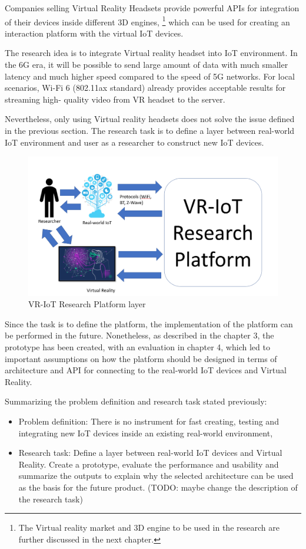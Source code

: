Companies selling Virtual Reality Headsets provide powerful APIs for integration of their devices inside different 3D engines, \footnote{The Virtual reality  market and 3D engine to be used in the research are further discussed in the next chapter.} which can be used for creating an interaction platform with the virtual IoT devices.

The research idea is to integrate Virtual reality headset into IoT environment. In the 6G era, it will be possible to send large amount of data with much smaller latency and much higher speed compared to the speed of 5G networks. For local scenarios, Wi-Fi 6 (802.11ax standard) already provides acceptable results for streaming high- quality video from VR headset to the server.

Nevertheless, only using Virtual reality headsets does not solve the issue defined in the previous section. The research task is to define a layer between real-world IoT environment and user as a researcher to construct new IoT devices. 

\begin{figure}
  \centering
  \includegraphics[width=0.9\linewidth]{figures/VR-IoTResearchPlatformLayer.png}
  \caption{VR-IoT Research Platform layer}
  \label{fig:VR-IoTResearchPlatformLayer-figure}
\end{figure}

Since the task is to define the platform, the implementation of the platform can be performed in the future. Nonetheless, as described in the chapter 3, the prototype has been created, with an evaluation in chapter 4, which led to important assumptions on how the platform should be designed in terms of architecture and API for connecting to the real-world IoT devices and Virtual Reality.

Summarizing the problem definition and research task stated previously:

\begin{itemize}
    \item Problem definition: There is no instrument for fast creating, testing and integrating new IoT devices inside an existing real-world environment,
    \item Research task: Define a layer between real-world IoT devices and Virtual Reality. Create a prototype, evaluate the performance and usability and summarize the outputs to explain why the selected architecture can be used as the basis for the future product. (TODO: maybe change the description of the research task)
\end{itemize}
